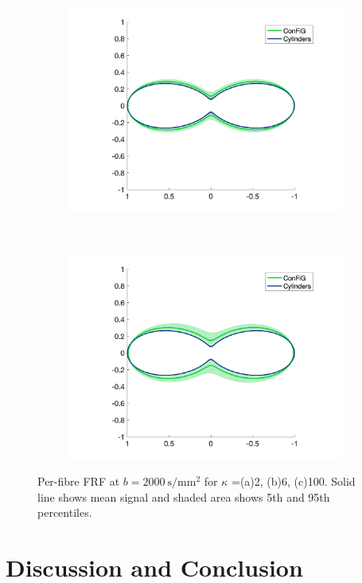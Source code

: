 \begin{figure}
  \centering
  \begin{subfigure}[]{0.4\textwidth}
    \includegraphics[width=\textwidth]{figures/frf_experiment/twoperp_prctiles_b_2000.png}
    \caption{}
  \end{subfigure}
  ~
  \begin{subfigure}[]{0.4\textwidth}
    \includegraphics[width=\textwidth]{figures/frf_experiment/threeperp10deg_prctiles_b_2000.png}
    \caption{}
  \end{subfigure}

  \caption{Per-fibre FRF at $b = \SI{2000}{\second\per\milli\metre\squared}$ for $\kappa$ =(a)2, (b)6, (c)100. Solid line shows mean signal and shaded area shows 5th and 95th percentiles. }
  \label{fig:frf_prctiles_kappa_b2000}
\end{figure}

\section{Discussion and Conclusion }
\label{sec:frf_discussion}


